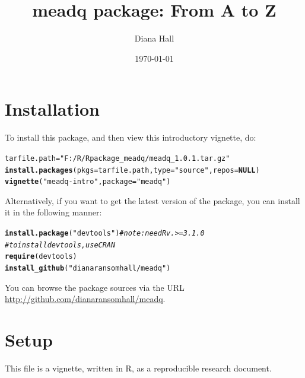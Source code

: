 \documentclass{article}\usepackage[]{graphicx}\usepackage[]{color}
\makeatletter
\newcommand{\hlstr}[1]{\textcolor[rgb]{0.192,0.494,0.8}{#1}}%
\newcommand{\hlcom}[1]{\textcolor[rgb]{0.678,0.584,0.686}{\textit{#1}}}%
\newcommand{\hlstd}[1]{\textcolor[rgb]{0.345,0.345,0.345}{#1}}%
\newcommand{\hlkwa}[1]{\textcolor[rgb]{0.161,0.373,0.58}{\textbf{#1}}}%
\newcommand{\hlkwb}[1]{\textcolor[rgb]{0.69,0.353,0.396}{#1}}%
\newcommand{\hlkwc}[1]{\textcolor[rgb]{0.333,0.667,0.333}{#1}}%
\newcommand{\hlkwd}[1]{\textcolor[rgb]{0.737,0.353,0.396}{\textbf{#1}}}%
\newenvironment{kframe}{%
 \def\at@end@of@kframe{}%
 \ifinner\ifhmode%
  \def\at@end@of@kframe{\end{minipage}}%
  \begin{minipage}{\columnwidth}%
 \fi\fi%
 \def\FrameCommand##1{\hskip\@totalleftmargin \hskip-\fboxsep
 \colorbox{shadecolor}{##1}\hskip-\fboxsep
     \hskip-\linewidth \hskip-\@totalleftmargin \hskip\columnwidth}%
 \MakeFramed {\advance\hsize-\width
   \@totalleftmargin\z@ \linewidth\hsize
   \@setminipage}}%
 {\par\unskip\endMakeFramed%
 \at@end@of@kframe}
\newenvironment{knitrout}{}{} %
\makeatother
\begin{document}
\onehalfspacing
\title{meadq package: From A to Z }

\author{Diana Hall}
\date{\today}

\maketitle


\section*{Installation}
To install this package, and then view this introductory vignette, do:

\begin{knitrout}
\color{fgcolor}\begin{kframe}
\begin{alltt}
\hlstd{tarfile.path} \hlkwb{=} \hlstr{"F:/R/Rpackage_meadq/meadq_1.0.1.tar.gz"}
\hlkwd{install.packages}\hlstd{(}\hlkwc{pkgs} \hlstd{= tarfile.path,} \hlkwc{type} \hlstd{=} \hlstr{"source"}\hlstd{,} \hlkwc{repos} \hlstd{=} \hlkwa{NULL}\hlstd{)}
\hlkwd{vignette}\hlstd{(}\hlstr{"meadq-intro"}\hlstd{,} \hlkwc{package} \hlstd{=} \hlstr{"meadq"}\hlstd{)}
\end{alltt}
\end{kframe}
\end{knitrout}


Alternatively, if you want to get the latest version of the package,
you can install it in the following manner:
\begin{knitrout}
\color{fgcolor}\begin{kframe}
\begin{alltt}
\hlkwd{install.package}\hlstd{(}\hlstr{"devtools"}\hlstd{)}  \hlcom{# note: need R v.>=3.1.0}
\hlcom{# to install devtools, use CRAN}
\hlkwd{require}\hlstd{(devtools)}
\hlkwd{install_github}\hlstd{(}\hlstr{"dianaransomhall/meadq"}\hlstd{)}
\end{alltt}
\end{kframe}
\end{knitrout}

You can browse the package sources via the URL
\url{http://github.com/dianaransomhall/meadq}.


\section*{Setup}
This file is a vignette, written in R, as a reproducible research
document.
\end{document}
